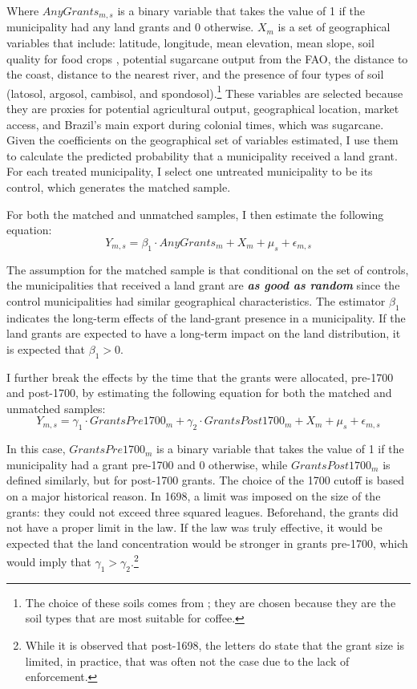 \documentclass[11pt]{article}
\begin{document}
Where $AnyGrants_{m,s}$ is a binary variable that takes the value of 1 if the municipality had any land grants and 0 otherwise.
$X_m$ is a set of geographical variables that include: latitude, longitude, mean elevation, mean slope, soil quality for food crops \parencite{Galor2016-ba}, potential sugarcane output from the FAO, the distance to the coast, distance to the nearest river, and the presence of four types of soil (latosol, argosol, cambisol, and spondosol).\footnote{The choice of these soils comes from \textcite{Rocha2017-yq}; they are chosen because they are the soil types that are most suitable for coffee.}
These variables are selected because they are proxies for potential agricultural output, geographical location, market access, and Brazil's main export during colonial times, which was sugarcane. 
Given the coefficients on the geographical set of variables estimated, I use them to calculate the predicted probability that a municipality received a land grant. 
For each treated municipality, I select one untreated municipality to be its control, which generates the matched sample.

For both the matched and unmatched samples, I then estimate the following equation:
\begin{equation}
  \label{eqn:ols_matching_all}
  Y_{m,s} = \beta_1 \cdot AnyGrants_m + X_{m} + \mu_s + \epsilon_{m,s}
\end{equation}

The assumption for the matched sample is that conditional on the set of controls, the municipalities that received a land grant are \textbf{\textit{as good as random}} since the control municipalities had similar geographical characteristics. 
The estimator $\beta_1$ indicates the long-term effects of the land-grant presence in a municipality. 
If the land grants are expected to have a long-term impact on the land distribution, it is expected that $\beta_1 > 0$.

I further break the effects by the time that the grants were allocated, pre-1700 and post-1700, by estimating the following equation for both the matched and unmatched samples:
\begin{equation}
  \label{eqn:ols_matching}
  Y_{m,s} = \gamma_1 \cdot GrantsPre1700_m + \gamma_2 \cdot GrantsPost1700_m + X_{m} + \mu_s + \epsilon_{m,s}
\end{equation}

In this case, $GrantsPre1700_m$ is a binary variable that takes the value of 1 if the municipality had a grant pre-1700 and 0 otherwise, while $GrantsPost1700_m$ is defined similarly, but for post-1700 grants.
The choice of the 1700 cutoff is based on a major historical reason. In 1698, a limit was imposed on the size of the grants: they could not exceed three squared leagues. 
Beforehand, the grants did not have a proper limit in the law.
If the law was truly effective, it would be expected that the land concentration would be stronger in grants pre-1700, which would imply that $\gamma_1 > \gamma_2$.\footnote{While it is observed that post-1698, the letters do state that the grant size is limited, in practice, that was often not the case due to the lack of enforcement.}
\end{document}
